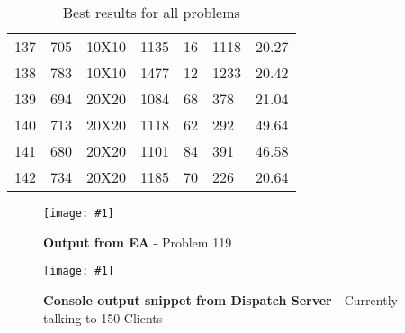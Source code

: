\documentclass[14pt]{acmsiggraph}
\newcommand{\figuremacroF}[4]{
	\begin{figure*}[t] %
		\centering
		\texttt{[image: \#1]}
		\caption[#2]{\textbf{#2} - #3}
		\label{fig:#1}
	\end{figure*}
}
\begin{document}
\begin{table}[h!]
\begin{center}
{\begin{tabular}{||lllllll}
					137 & 705  & 10X10  & \cellcolor[rgb]{1,0.72,0.4}1135     & 16  & 1118 & 20.27 \\
					138 & 783  & 10X10  & \cellcolor[rgb]{1,0.21,0.12}1477    & 12  & 1233 & 20.42 \\
					139 & 694  & 20X20  & \cellcolor[rgb]{1,0.8,0.45}1084     & 68  & 378  & 21.04 \\
					140 & 713  & 20X20  & \cellcolor[rgb]{1,0.8,0.45}1118     & 62  & 292  & 49.64 \\
					141 & 680  & 20X20  & \cellcolor[rgb]{1,0.7,0.39}1101     & 84  & 391  & 46.58 \\
					142 & 734  & 20X20  & \cellcolor[rgb]{1,0.71,0.4}1185     & 70  & 226  & 20.64 \\
				\end{tabular}\centering
			}
			
			\caption{Best results for all problems}
			\label{finalResults}
		\end{center}
		
	\end{table}
	
	\figuremacroF
	{genalgrunning}
	{Output from EA}
	{Problem 119}
	{1.0}
	\figuremacroF
	{dispatchcmd}
	{Console output snippet from Dispatch Server}
	{Currently talking to 150 Clients}
	{1.0}
	
\end{document}
